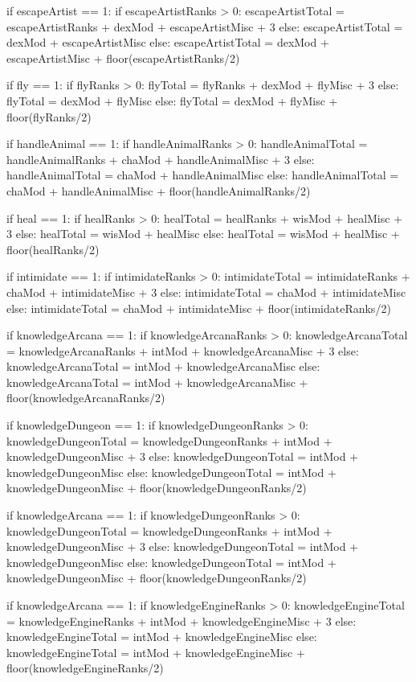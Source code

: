 \documentclass[10pt]{article}
\begin{document}
\begin{sagesilent}
if escapeArtist == 1:
	 if escapeArtistRanks > 0:
	  escapeArtistTotal = escapeArtistRanks + dexMod + escapeArtistMisc + 3
	 else:
	  escapeArtistTotal = dexMod + escapeArtistMisc
else:
	 escapeArtistTotal = dexMod + escapeArtistMisc + floor(escapeArtistRanks/2)

if fly == 1:
	 if flyRanks > 0:
	  flyTotal = flyRanks + dexMod + flyMisc + 3
	 else:
	  flyTotal = dexMod + flyMisc
else:
	 flyTotal = dexMod + flyMisc + floor(flyRanks/2)

if handleAnimal == 1:
	 if handleAnimalRanks > 0:
	  handleAnimalTotal = handleAnimalRanks + chaMod + handleAnimalMisc + 3
	 else:
	  handleAnimalTotal = chaMod + handleAnimalMisc
else:
	 handleAnimalTotal = chaMod + handleAnimalMisc + floor(handleAnimalRanks/2)

if heal == 1:
	 if healRanks > 0:
	  healTotal = healRanks + wisMod + healMisc + 3
	 else:
	  healTotal = wisMod + healMisc
else:
	 healTotal = wisMod + healMisc + floor(healRanks/2)

if intimidate == 1:
	 if intimidateRanks > 0:
	  intimidateTotal = intimidateRanks + chaMod + intimidateMisc + 3
	 else:
	  intimidateTotal = chaMod + intimidateMisc
else:
	 intimidateTotal = chaMod + intimidateMisc + floor(intimidateRanks/2)

if knowledgeArcana == 1:
	 if knowledgeArcanaRanks > 0:
	  knowledgeArcanaTotal = knowledgeArcanaRanks + intMod + knowledgeArcanaMisc + 3
	 else:
	  knowledgeArcanaTotal = intMod + knowledgeArcanaMisc
else:
	 knowledgeArcanaTotal = intMod + knowledgeArcanaMisc + floor(knowledgeArcanaRanks/2)

if knowledgeDungeon == 1:
	 if knowledgeDungeonRanks > 0:
	  knowledgeDungeonTotal = knowledgeDungeonRanks + intMod + knowledgeDungeonMisc + 3
	 else:
	  knowledgeDungeonTotal = intMod + knowledgeDungeonMisc
else:
	 knowledgeDungeonTotal = intMod + knowledgeDungeonMisc + floor(knowledgeDungeonRanks/2)

if knowledgeArcana == 1:
	 if knowledgeDungeonRanks > 0:
	  knowledgeDungeonTotal = knowledgeDungeonRanks + intMod + knowledgeDungeonMisc + 3
	 else:
	  knowledgeDungeonTotal = intMod + knowledgeDungeonMisc
else:
	 knowledgeDungeonTotal = intMod + knowledgeDungeonMisc + floor(knowledgeDungeonRanks/2)

if knowledgeArcana == 1:
	 if knowledgeEngineRanks > 0:
	  knowledgeEngineTotal = knowledgeEngineRanks + intMod + knowledgeEngineMisc + 3
	 else:
	  knowledgeEngineTotal = intMod + knowledgeEngineMisc
else:
	 knowledgeEngineTotal = intMod + knowledgeEngineMisc + floor(knowledgeEngineRanks/2)


\end{sagesilent}
\end{document}
